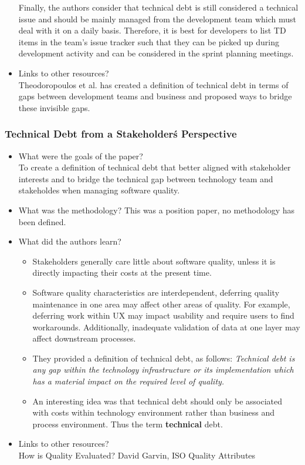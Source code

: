 \documentclass{mprop}
\begin{document}
\begin{itemize}
	      Finally, the authors consider that technical debt is still considered a technical issue and should be mainly managed from the development team which must deal with it on a daily basis.
	      Therefore, it is best for developers to list TD items in the team's issue tracker such that they can be picked up during development activity and can be considered in the sprint planning meetings.
	\item Links to other resources? \\
	      Theodoropoulos et al. \cite{Theodoropoulos2011} has created a definition of technical debt in terms of gaps between development teams and business and proposed ways to bridge these invisible gaps.
\end{itemize}

\subsubsection{Technical Debt from a Stakeholder\'s Perspective} \cite{Theodoropoulos2011}

\begin{itemize}
	\item What were the goals of the paper? \\
	      To create a definition of technical debt that better aligned with stakeholder interests and to bridge the technical gap between technology team and stakeholdes when managing software quality.
	\item What was the methodology?
	      This was a position paper, no methodology has been defined.
	\item What did the authors learn?
	      \begin{itemize}
		      \item Stakeholders generally care little about software quality, unless it is directly impacting their costs at the present time.
		      \item Software quality characteristics are interdependent, deferring quality maintenance in one area may affect other areas of quality. For example, deferring work within UX may impact usability and require users to find workarounds. Additionally, inadequate validation of data at one layer may affect downstream processes.
		      \item They provided a definition of technical debt, as follows: \textit{Technical debt is any gap within the technology infrastructure or its implementation which has a material impact on the required level of quality.}
		      \item An interesting idea was that technical debt should only be associated with costs within technology environment rather than business and process environment. Thus the term \textbf{technical} debt.
	      \end{itemize}
	\item Links to other resources? \\
	      How is Quality Evaluated? David Garvin, ISO Quality Attributes
\end{itemize}
\end{document}
